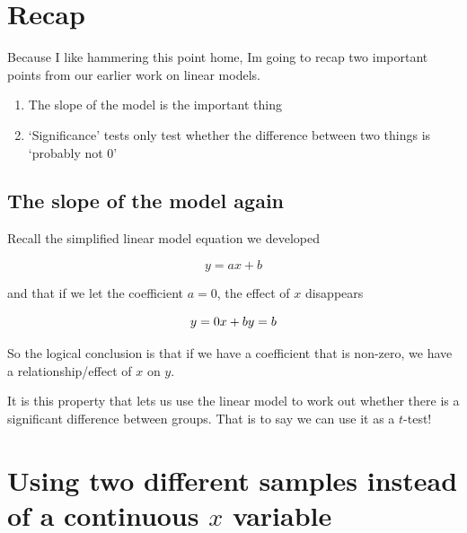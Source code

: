 \documentclass[
]{book}
\providecommand{\tightlist}{%
  \setlength{\itemsep}{0pt}\setlength{\parskip}{0pt}}
\begin{document}
\hypertarget{recap}{%
\section{Recap}\label{recap}}

Because I like hammering this point home, Im going to recap two important points from our earlier work on linear models.

\begin{enumerate}
\def\labelenumi{\arabic{enumi}.}
\tightlist
\item
  The slope of the model is the important thing
\item
  `Significance' tests only test whether the difference between two things is `probably not 0'
\end{enumerate}

\hypertarget{the-slope-of-the-model-again}{%
\subsection{The slope of the model again}\label{the-slope-of-the-model-again}}

Recall the simplified linear model equation we developed

\begin{equation}
y = ax + b
\end{equation}

and that if we let the coefficient \(a = 0\), the effect of \(x\) disappears

\begin{equation}
y = 0 x + b\\
y = b
\end{equation}

So the logical conclusion is that if we have a coefficient that is non-zero, we have a relationship/effect of \(x\) on \(y\).

It is this property that lets us use the linear model to work out whether there is a significant difference between groups. That is to say we can use it as a \(t\)-test!

\hypertarget{using-two-different-samples-instead-of-a-continuous-x-variable}{%
\section{\texorpdfstring{Using two different samples instead of a continuous \(x\) variable}{Using two different samples instead of a continuous x variable}}\label{using-two-different-samples-instead-of-a-continuous-x-variable}}
\end{document}
